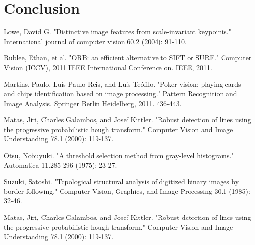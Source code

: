 \documentclass[journal,twoside]{IEEEtran}
\begin{document}

\section{Conclusion}




\begin{thebibliography}{9}

Lowe, David G. "Distinctive image features from scale-invariant keypoints." International journal of computer vision 60.2 (2004): 91-110.

Rublee, Ethan, et al. "ORB: an efficient alternative to SIFT or SURF." Computer Vision (ICCV), 2011 IEEE International Conference on. IEEE, 2011.

Martins, Paulo, Luís Paulo Reis, and Luís Teófilo. "Poker vision: playing cards and chips identification based on image processing." Pattern Recognition and Image Analysis. Springer Berlin Heidelberg, 2011. 436-443.

Matas, Jiri, Charles Galambos, and Josef Kittler. "Robust detection of lines using the progressive probabilistic hough transform." Computer Vision and Image Understanding 78.1 (2000): 119-137.

Otsu, Nobuyuki. "A threshold selection method from gray-level histograms." Automatica 11.285-296 (1975): 23-27.

Suzuki, Satoshi. "Topological structural analysis of digitized binary images by border following." Computer Vision, Graphics, and Image Processing 30.1 (1985): 32-46.

Matas, Jiri, Charles Galambos, and Josef Kittler. "Robust detection of lines using the progressive probabilistic hough transform." Computer Vision and Image Understanding 78.1 (2000): 119-137.




\end{thebibliography}
\end{document}
